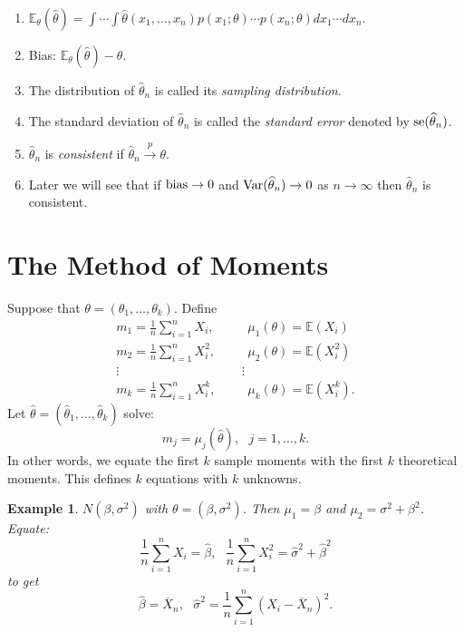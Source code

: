 \documentclass[twoside,12pt]{article}
\newtheorem{example}[theorem]{Example}
\newcommand{\cprob}{\overset{p}{\rightarrow}}
\begin{document}
\begin{enumerate}
\item $\mathbb{E}_\theta(\widehat\theta) =
\int\cdots \int \widehat\theta(x_1,\ldots, x_n) p(x_1;\theta)\cdots p(x_n;\theta) dx_1 \cdots dx_n$.
\item Bias: $\mathbb{E}_\theta(\widehat\theta) - \theta$.
\item The distribution of $\widehat\theta_n$ is called its {\em sampling distribution}.
\item The standard deviation of $\widehat\theta_n$ is called the
{\em standard error} denoted by ${\rm se}(\widehat\theta_n)$.
\item $\widehat\theta_n$ is {\em consistent} if $\widehat\theta_n\cprob \theta$.
\item Later we will see that if
${\rm bias}\to 0$ and ${\rm Var}(\widehat\theta_n)\to 0$ as $n\to \infty$ then
$\widehat\theta_n$ is consistent.
\end{enumerate}

\section{The Method of Moments}

Suppose that
$\theta = (\theta_1,\ldots, \theta_k)$.
Define
\begin{eqnarray*}
m_1 = \frac{1}{n}\sum_{i=1}^n X_i , \ \ &&\ \ \mu_1(\theta) = \mathbb{E}(X_i)\\
m_2 = \frac{1}{n}\sum_{i=1}^n X_i^2 , \ \ &&\ \ \mu_2(\theta) = \mathbb{E}(X_i^2)\\
\vdots && \vdots\\
m_k = \frac{1}{n}\sum_{i=1}^n X_i^k , \ \ &&\ \ \mu_k(\theta) = \mathbb{E}(X_i^k).
\end{eqnarray*}
Let $\widehat\theta = (\widehat\theta_1,\ldots,\widehat\theta_k)$ solve:
$$
m_j = \mu_j(\widehat\theta),\ \ \ j=1,\ldots, k.
$$
In other words, we equate the first $k$ sample moments
with the first $k$ theoretical moments.
This defines $k$ equations with $k$ unknowns.

\vspace{1cm}

\begin{example}
$N(\beta,\sigma^2)$ with
$\theta = (\beta,\sigma^2)$.
Then
$\mu_1 = \beta$ and $\mu_2 = \sigma^2 + \beta^2$.
Equate:
$$
\frac{1}{n}\sum_{i=1}^n X_i = \widehat\beta,\ \ \ 
\frac{1}{n}\sum_{i=1}^n X_i^2 = \widehat\sigma^2 + \widehat\beta^2
$$
to get
$$
\widehat\beta = \overline{X}_n,\ \ \ 
\widehat\sigma^2 = \frac{1}{n}\sum_{i=1}^n (X_i - \overline{X}_n)^2.
$$
\end{example}
\end{document}
